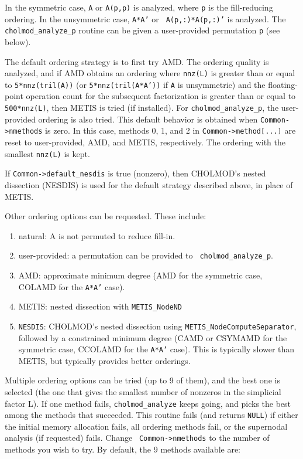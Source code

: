 \documentclass[11pt]{article}
\begin{document}
In the symmetric case, {\tt A} or {\tt A(p,p)} is analyzed, where {\tt p} is
the fill-reducing ordering.  In the unsymmetric case, {\tt A*A'} or {\tt
A(p,:)*A(p,:)'} is analyzed.  The {\tt cholmod\_analyze\_p} routine can be
given a user-provided permutation {\tt p} (see below).

The default ordering strategy is to first try AMD.  The ordering quality is
analyzed, and if AMD obtains an ordering where {\tt nnz(L)} is greater than or
equal to {\tt 5*nnz(tril(A))} (or {\tt 5*nnz(tril(A*A'))} if {\tt A} is
unsymmetric) and the floating-point operation count for the subsequent
factorization is greater than or equal to {\tt 500*nnz(L)}, then METIS is tried
(if installed).  For {\tt cholmod\_analyze\_p}, the user-provided ordering is
also tried.  This default behavior is obtained when {\tt Common->nmethods} is
zero.  In this case, methods 0, 1, and 2 in {\tt Common->method[...]} are reset
to user-provided, AMD, and METIS, respectively.  The ordering with the smallest
{\tt nnz(L)} is kept.

If {\tt Common->default\_nesdis} is true (nonzero), then CHOLMOD's nested
dissection (NESDIS) is used for the default strategy described above, in place
of METIS.

Other ordering options can be requested.  These include:
\begin{enumerate}
\item   natural:    A is not permuted to reduce fill-in.
\item   user-provided:      a permutation can be provided to {\tt
    cholmod\_analyze\_p}.
\item   AMD:        approximate minimum degree (AMD for the symmetric case,
    COLAMD for the {\tt A*A'} case).
\item   METIS:      nested dissection with {\tt METIS\_NodeND}
\item   {\tt NESDIS}:       CHOLMOD's nested dissection using
    {\tt METIS\_NodeComputeSeparator}, followed by a constrained minimum degree
    (CAMD or CSYMAMD for the symmetric case, CCOLAMD for the {\tt A*A'} case).
    This is typically slower than METIS, but typically provides better
    orderings.
\end{enumerate}

Multiple ordering options can be tried (up to 9 of them), and the best one is
selected (the one that gives the smallest number of nonzeros in the simplicial
factor L).  If one method fails, {\tt cholmod\_analyze} keeps going, and picks
the best among the methods that succeeded.  This routine fails (and returns
{\tt NULL}) if either the initial memory allocation fails, all ordering methods
fail, or the supernodal analysis (if requested) fails.  Change {\tt
Common->nmethods} to the number of methods you wish to try.  By default, the 9
methods available are:
\end{document}
